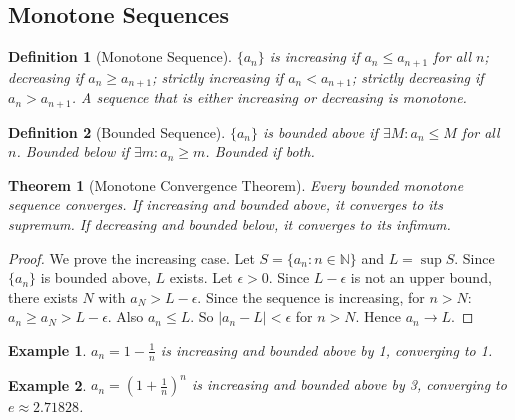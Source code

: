 \documentclass[11pt,a4paper]{article}
\newtheorem{example}{Example}
\newtheorem{theorem}{Theorem}
\newtheorem{definition}{Definition}
\begin{document}
\subsection{Monotone Sequences}
\begin{definition}[Monotone Sequence]
$\{a_n\}$ is \textit{increasing} if $a_n \leq a_{n+1}$ for all $n$; \textit{decreasing} if $a_n \geq a_{n+1}$; \textit{strictly increasing} if $a_n < a_{n+1}$; \textit{strictly decreasing} if $a_n > a_{n+1}$. A sequence that is either increasing or decreasing is \textit{monotone}.
\end{definition}
\begin{definition}[Bounded Sequence]
$\{a_n\}$ is \textit{bounded above} if $\exists M: a_n \leq M$ for all $n$. \textit{Bounded below} if $\exists m: a_n \geq m$. \textit{Bounded} if both.
\end{definition}
\begin{theorem}[Monotone Convergence Theorem]
Every bounded monotone sequence converges. If increasing and bounded above, it converges to its supremum. If decreasing and bounded below, it converges to its infimum.
\end{theorem}
\begin{proof}
We prove the increasing case. Let $S = \{a_n : n \in \mathbb{N}\}$ and $L = \sup S$. Since $\{a_n\}$ is bounded above, $L$ exists. Let $\epsilon > 0$. Since $L - \epsilon$ is not an upper bound, there exists $N$ with $a_N > L - \epsilon$. Since the sequence is increasing, for $n > N$: $a_n \geq a_N > L - \epsilon$. Also $a_n \leq L$. So $|a_n - L| < \epsilon$ for $n > N$. Hence $a_n \to L$.
\end{proof}
\begin{example}
$a_n = 1 - \frac{1}{n}$ is increasing and bounded above by 1, converging to 1.
\end{example}
\begin{example}
$a_n = \left(1 + \frac{1}{n}\right)^n$ is increasing and bounded above by 3, converging to $e \approx 2.71828$.
\end{example}
\end{document}
